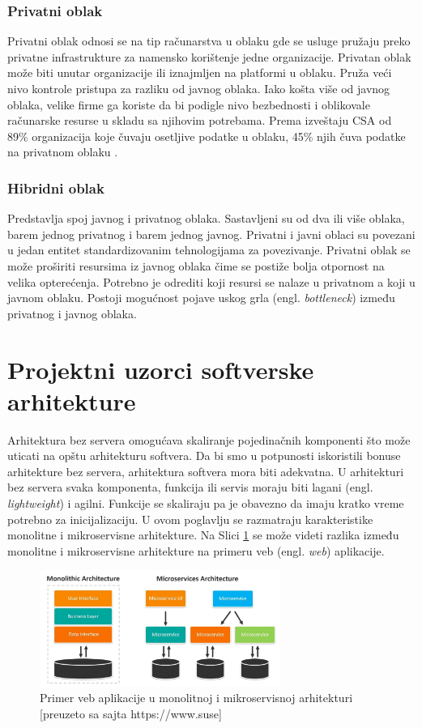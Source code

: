\documentclass[12pt,oneside]{memoir}
\begin{document}
\subsubsection{Privatni oblak}
Privatni oblak odnosi se na tip računarstva u oblaku gde se usluge pružaju preko privatne infrastrukture za namensko korištenje jedne organizacije. Privatan oblak može biti unutar organizacije ili iznajmljen na platformi u oblaku. Pruža veći nivo kontrole pristupa za razliku od javnog oblaka. Iako košta više od javnog oblaka, velike firme ga koriste da bi podigle nivo bezbednosti i oblikovale računarske resurse u skladu sa njihovim potrebama. Prema izveštaju CSA od 89\% organizacija koje čuvaju osetljive podatke u oblaku, 45\% njih čuva podatke na privatnom oblaku \cite{csa}.


\subsubsection{Hibridni oblak}
Predstavlja spoj javnog i privatnog oblaka. Sastavljeni su od dva ili više oblaka, barem jednog privatnog i barem jednog javnog. Privatni i javni oblaci su povezani u jedan entitet standardizovanim tehnologijama za povezivanje. Privatni oblak se može proširiti resursima iz javnog oblaka čime se postiže bolja otpornost na velika opterećenja. Potrebno je odrediti koji resursi se nalaze u privatnom a koji u javnom oblaku. Postoji mogućnost pojave uskog grla (engl. \emph{bottleneck}) između privatnog i javnog oblaka.


\section{Projektni uzorci softverske arhitekture}
Arhitektura bez servera omogućava skaliranje pojedinačnih komponenti što može uticati na opštu arhitekturu softvera. Da bi smo u potpunosti iskoristili bonuse arhitekture bez servera, arhitektura softvera mora biti adekvatna. U arhitekturi bez servera svaka komponenta, funkcija ili servis moraju biti lagani (engl. \emph{lightweight}) i agilni. Funkcije se skaliraju pa je obavezno da imaju kratko vreme potrebno za inicijalizaciju. U ovom poglavlju se razmatraju karakteristike monolitne i mikroservisne arhitekture. Na Slici \ref{fig:arhitekturniProjektniUzorci} se može videti razlika između monolitne i mikroservisne arhitekture na primeru veb (engl. \emph{web}) aplikacije.

\begin{figure}[!ht]
  \centering
  \includegraphics[width=0.7\textwidth]{Slika 6.jpg}
  \caption{Primer veb aplikacije u monolitnoj i mikroservisnoj arhitekturi\\\footnotesize[preuzeto sa sajta https://www.suse]}
  \label{fig:arhitekturniProjektniUzorci}
\end{figure}
\end{document}
